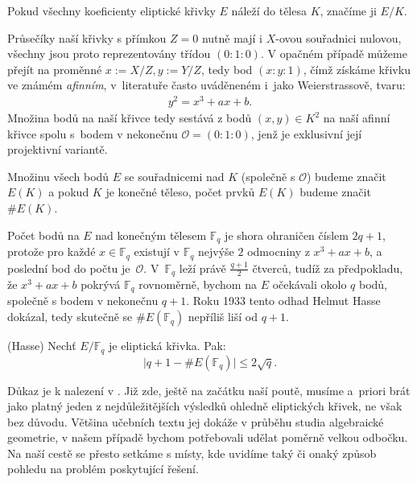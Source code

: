\documentclass[12pt]{report}
\begin{document}
\begin{znaceni}
Pokud všechny koeficienty eliptické křivky $E$ náleží do tělesa $K$, značíme ji $E/K$.
\end{znaceni}


Průsečíky naší křivky s přímkou $Z=0$ nutně mají i $X$-ovou souřadnici nulovou, všechny jsou proto reprezentovány třídou $(0:1:0)$. V opačném případě můžeme přejít na proměnné $x := X/Z, y:= Y/Z$, tedy bod $(x:y:1)$, čímž získáme křivku ve známém \textit{afinním}, v~literatuře  často uváděneném i~jako Weierstrassově, tvaru:
\begin{align*}
y^2 = x^3+ax+b.
\end{align*}
Množina bodů na naší křivce tedy sestává z bodů $(x,y) \in K^2$ na naší afinní křivce spolu s~bodem v nekonečnu $\mathcal{O} = (0:1:0)$, jenž je exklusivní její projektivní variantě. 

\begin{znaceni}
Množinu všech bodů $E$ se souřadnicemi nad $K$ (společně s $\mathcal{O}$) budeme značit $E(K)$ a pokud $K$ je konečné těleso, počet prvků $E(K)$ budeme značit $\# E(K)$.
\end{znaceni}

Počet bodů na $E$ nad konečným tělesem $\mathbb{F}_q$ je shora ohraničen číslem $2q+1$, protože pro každé $x \in \mathbb{F}_q$ existují v $\mathbb{F}_q$ nejvýše $2$ odmocniny z $x^3+ax+b$, a poslední bod do počtu je~$\mathcal{O}$. V~$\mathbb{F}_q$ leží právě $\frac{q+1}{2}$ čtverců, tudíž za předpokladu, že $x^3+ax+b$ pokrývá $\mathbb{F}_q$ rovnoměrně, bychom na $E$ očekávali okolo $q$ bodů, společně s bodem v nekonečnu $q+1$. Roku 1933 tento odhad Helmut Hasse dokázal, tedy skutečně se $\# E(\mathbb{F}_q)$ nepříliš liší od $q+1$.
\begin{veta}(Hasse)\label{Hasse}
Nechť $E/\mathbb{F}_q$ je eliptická křivka. Pak:
\begin{equation*}
\vert q+1 - \# E(\mathbb{F}_q) \vert \leqslant 2\sqrt{q}.
\end{equation*}
\end{veta}
 Důkaz je k nalezení v \cite[Thm. V.1.1]{Silverman}. Již zde, ještě na začátku naší poutě, musíme a~priori brát jako platný jeden z nejdůležitějších výsledků ohledně eliptických křivek, ne však bez důvodu. Většina učebních textu jej dokáže v průběhu studia algebraické geometrie, v našem případě bychom potřebovali udělat poměrně velkou odbočku. Na naší cestě se přesto setkáme s místy, kde uvidíme taký či onaký způsob pohledu na problém poskytující řešení.
 
\end{document}
